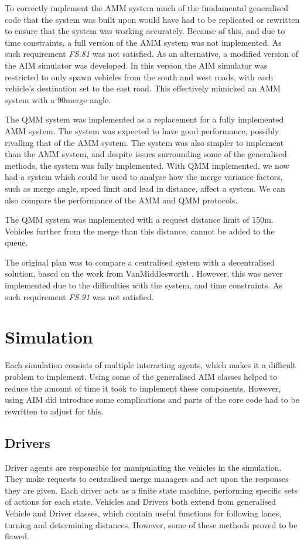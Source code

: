 To correctly implement the AMM system much of the fundamental generalised code that the system was built upon would have had to be replicated or rewritten to ensure that the system was working accurately. Because of this, and due to time constraints, a full version of the AMM system was not implemented. As such requirement \emph{FS.81} was not satisfied. As an alternative, a modified version of the AIM simulator was developed. In this version the AIM simulator was restricted to only spawn vehicles from the south and west roads, with each vehicle's destination set to the east road. This effectively mimicked an AMM system with a 90\degree merge angle.

The QMM system was implemented as a replacement for a fully implemented AMM system. The system was expected to have good performance, possibly rivalling that of the AMM system. The system was also simpler to implement than the AMM system, and despite issues surrounding some of the generalised methods, the system was fully implemented. With QMM implemented, we now had a system which could be used to analyse how the merge variance factors, such as merge angle, speed limit and lead in distance, affect a system. We can also compare the performance of the AMM and QMM protocols.

The QMM system was implemented with a request distance limit of 150\si{m}. Vehicles further from the merge than this distance, cannot be added to the queue.

The original plan was to compare a centralised system with a decentralised solution, based on the work from VanMiddlesworth \citep{VanMiddlesworth2008}. However, this was never implemented due to the difficulties with the system, and time constraints. As such requirement \emph{FS.91} was not satisfied.

\section{Simulation}
\label{sec:Simulation}
Each simulation consists of multiple interacting agents, which makes it a difficult problem to implement. Using some of the generalised AIM classes helped to reduce the amount of time it took to implement these components. However, using AIM did introduce some complications and parts of the core code had to be rewritten to adjust for this.

\subsection{Drivers}
\label{subsec:Drivers}
Driver agents are responsible for manipulating the vehicles in the simulation. They make requests to centralised merge managers and act upon the responses they are given. Each driver acts as a finite state machine, performing specific sets of actions for each state. Vehicles and Drivers both extend from generalised Vehicle and Driver classes, which contain useful functions for following lanes, turning and determining distances. However, some of these methods proved to be flawed.

